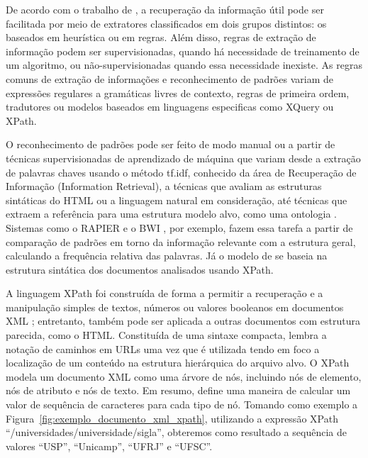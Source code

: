 De acordo com o trabalho de \citet{Sleiman2011}, a recuperação da informação útil pode ser facilitada por meio de extratores classificados em dois grupos distintos: os baseados em heurística ou em regras. Além disso, regras de extração de informação podem ser supervisionadas, quando há necessidade de treinamento de um algoritmo, ou não-supervisionadas quando essa necessidade inexiste. As regras comuns de extração de informações e reconhecimento de padrões variam de expressões regulares a gramáticas livres de contexto, regras de primeira ordem, tradutores ou modelos baseados em linguagens especificas como XQuery ou XPath. 

O reconhecimento de padrões pode ser feito de modo manual ou a partir de técnicas supervisionadas de aprendizado de máquina que variam desde a extração de palavras chaves usando o método tf.idf, conhecido da área de Recuperação de Informação (Information Retrieval), a técnicas que avaliam as estruturas sintáticas do HTML ou a linguagem natural em consideração, até técnicas que extraem a referência para uma estrutura modelo alvo, como uma ontologia \citep{Stumme2006}. Sistemas como o RAPIER \citep{Califf2004} e o BWI \citep{Freitag2000}, por exemplo, fazem essa tarefa a partir de comparação de padrões em torno da informação relevante com a estrutura geral, calculando a frequência relativa das palavras. Já o modelo de \citet{May} se baseia na estrutura sintática dos documentos analisados usando XPath.

A linguagem XPath foi construída de forma a permitir a recuperação e a manipulação simples de textos, números ou valores booleanos em documentos XML \citep{Clark1999}; entretanto, também pode ser aplicada a outras documentos com estrutura parecida,  como o HTML. Constituída de uma sintaxe compacta, lembra a notação de caminhos em URLs uma vez que é utilizada tendo em foco a localização de um conteúdo na estrutura hierárquica do arquivo alvo. O XPath modela um documento XML como uma árvore de nós, incluindo nós de elemento, nós de atributo e nós de texto. Em resumo, define uma maneira de calcular um valor de sequência de caracteres para cada tipo de nó. Tomando como exemplo a Figura~\ref{fig:exemplo_documento_xml_xpath}, utilizando a expressão XPath ``/universidades/universidade/sigla'', obteremos como resultado a sequência de valores ``USP'', ``Unicamp'', ``UFRJ'' e ``UFSC''.


